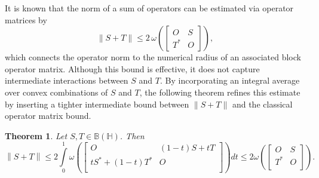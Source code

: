 \documentclass[12pt,twoside,reqno]{amsart}
\newtheorem{theorem}{Theorem}[section]
\numberwithin{equation}{section}
\begin{document}
It is known that the norm of a sum of operators can be estimated via operator matrices by \cite{Hirzallah_IEOT_2011}
\[
\|S+T\|\le 2\,\omega\!\left(
\begin{bmatrix}
O & S\\
T^{*} & O
\end{bmatrix}
\right),
\]
which connects the operator norm to the numerical radius of an associated block operator matrix. Although this bound is effective, it does not capture intermediate interactions between $S$ and $T$. By incorporating an integral average over convex combinations of $S$ and $T$, the following theorem refines this estimate by inserting a tighter intermediate bound between $\|S+T\|$ and the classical operator matrix bound.

\begin{theorem}\label{Thm_S_T_Main}
Let $S,T\in \mathbb B\left( \mathbb H \right)$. Then \[\left\| S+T \right\|\le 2\int\limits_{0}^{1}{\omega \left( \left[ \begin{matrix} O & \left( 1-t \right)S+tT \\ t{{S}^{*}}+\left( 1-t \right){{T}^{*}} & O \\ \end{matrix} \right] \right)dt}\le 2\omega \left( \left[ \begin{matrix} O & S \\ {{T}^{*}} & O \\ \end{matrix} \right] \right).\]
\end{theorem}
\end{document}
